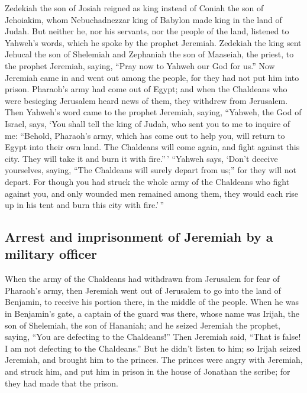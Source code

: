  Zedekiah the son of Josiah reigned as king instead of
Coniah the son of Jehoiakim, whom Nebuchadnezzar king of Babylon made
king in the land of Judah.  But neither he, nor his
servants, nor the people of the land, listened to Yahweh's words, which
he spoke by the prophet Jeremiah.  Zedekiah the king sent
Jehucal the son of Shelemiah and Zephaniah the son of Maaseiah, the
priest, to the prophet Jeremiah, saying, ``Pray now to Yahweh our God
for us.''  Now Jeremiah came in and went out among the
people, for they had not put him into prison.  Pharaoh's
army had come out of Egypt; and when the Chaldeans who were besieging
Jerusalem heard news of them, they withdrew from Jerusalem.
 Then Yahweh's word came to the prophet Jeremiah, saying,
 ``Yahweh, the God of Israel, says, `You shall tell the
king of Judah, who sent you to me to inquire of me: ``Behold, Pharaoh's
army, which has come out to help you, will return to Egypt into their
own land.  The Chaldeans will come again, and fight
against this city. They will take it and burn it with fire.''\,'
 ``Yahweh says, `Don't deceive yourselves, saying, ``The
Chaldeans will surely depart from us;'' for they will not depart.
 For though you had struck the whole army of the
Chaldeans who fight against you, and only wounded men remained among
them, they would each rise up in his tent and burn this city with
fire.'\,''

\hypertarget{arrest-and-imprisonment-of-jeremiah-by-a-military-officer}{%
\subsection{Arrest and imprisonment of Jeremiah by a military
officer}\label{arrest-and-imprisonment-of-jeremiah-by-a-military-officer}}

 When the army of the Chaldeans had withdrawn from
Jerusalem for fear of Pharaoh's army,  then Jeremiah went
out of Jerusalem to go into the land of Benjamin, to receive his portion
there, in the middle of the people.  When he was in
Benjamin's gate, a captain of the guard was there, whose name was
Irijah, the son of Shelemiah, the son of Hananiah; and he seized
Jeremiah the prophet, saying, ``You are defecting to the Chaldeans!''
 Then Jeremiah said, ``That is false! I am not defecting
to the Chaldeans.'' But he didn't listen to him; so Irijah seized
Jeremiah, and brought him to the princes.  The princes
were angry with Jeremiah, and struck him, and put him in prison in the
house of Jonathan the scribe; for they had made that the prison.

